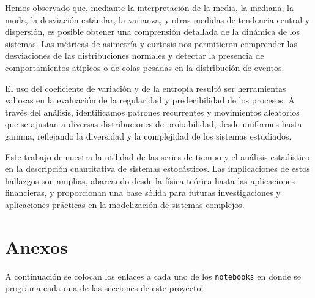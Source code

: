 \documentclass[11pt]{article} %
\begin{document}
Hemos observado que, mediante la interpretación de la media, la mediana, la moda, la desviación estándar, la varianza, y otras medidas de tendencia central y dispersión, es posible obtener una comprensión detallada de la dinámica de los sistemas. Las métricas de asimetría y curtosis nos permitieron comprender las desviaciones de las distribuciones normales y detectar la presencia de comportamientos atípicos o de colas pesadas en la distribución de eventos.

El uso del coeficiente de variación y de la entropía resultó ser herramientas valiosas en la evaluación de la regularidad y predecibilidad de los procesos. A través del análisis, identificamos patrones recurrentes y movimientos aleatorios que se ajustan a diversas distribuciones de probabilidad, desde uniformes hasta gamma, reflejando la diversidad y la complejidad de los sistemas estudiados.

Este trabajo demuestra la utilidad de las series de tiempo y el análisis estadístico en la descripción cuantitativa de sistemas estocásticos. Las implicaciones de estos hallazgos son amplias, abarcando desde la física teórica hasta las aplicaciones financieras, y proporcionan una base sólida para futuras investigaciones y aplicaciones prácticas en la modelización de sistemas complejos.




\newpage
\section{Anexos}

A continuación se colocan los enlaces a cada uno de los \texttt{notebooks} en donde se programa cada una de las secciones de este proyecto:
\end{document}
